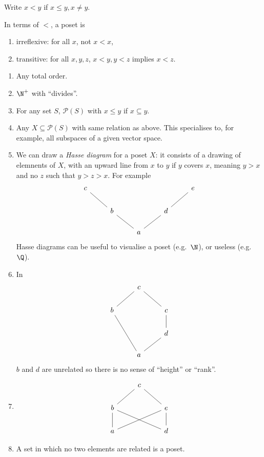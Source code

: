 \documentclass[a4paper]{article}
\begin{document}
\begin{notation}
  Write \(x < y\) if \(x \leq y, x \neq y\).

  In terms of \(<\), a poset is
  \begin{enumerate}
  \item irreflexive: for all \(x\), not \(x < x\),
  \item transitive: for all \(x, y, z\), \(x < y, y < z\) implies \(x < z\).
  \end{enumerate}
\end{notation}

\begin{eg}\leavevmode
  \begin{enumerate}
  \item Any total order.
  \item \(\N^+\) with ``divides''.
  \item For any set \(S\), \(\mathcal P(S)\) with \(x \leq y\) if \(x \subseteq y\).
  \item Any \(X \subseteq \mathcal P(S)\) with same relation as above. This specialises to, for example, all subspaces of a given vector space.
  \item We can draw a \emph{Hasse diagram} for a poset \(X\): it consists of a drawing of elemnents of \(X\), with an upward line from \(x\) to \(y\) if \(y\) covers \(x\), meaning \(y > x\) and no \(z\) such that \(y > z > x\). For example
    \[
      \begin{tikzcd}
        c \ar[dr, dash] & & & & e \ar[dl, dash] \\
        & b \ar[dr, dash] & & d \ar[dl, dash] \\
        & & a
      \end{tikzcd}
    \]
    Hasse diagrams can be useful to visualise a poset (e.g.\ \(\N\)), or useless (e.g.\ \(\Q\)).
  \item In
    \[
      \begin{tikzcd}
        & c \ar[dl, dash] \ar[dr, dash] \\
        b \ar[ddr, dash] & & c \ar[d, dash] \\
        & & d \ar[dl, dash] \\
        & a
      \end{tikzcd}
    \]
    \(b\) and \(d\) are unrelated so there is no sense of ``height'' or ``rank''.
  \item
    \[
      \begin{tikzcd}
        & c \ar[dl, dash] \ar[dr, dash] \\
        b \ar[d, dash] \ar[drr, dash] & & e \ar[d, dash] \ar[dll, dash] \\
        a & & d
      \end{tikzcd}
    \]
  \item A set in which no two elements are related is a poset.
  \end{enumerate}
\end{eg}
\end{document}
